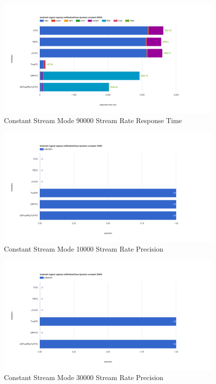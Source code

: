 \begin{figure}[!htbp]
    \centering
    \includegraphics[width=\textwidth]{img/app3-c-90000-r.png}
    \caption{Constant Stream Mode 90000 Stream Rate Response Time}
\end{figure}
\begin{figure}[!htbp]
    \centering
    \includegraphics[width=\textwidth]{img/app3-c-10000-p.png}
    \caption{Constant Stream Mode 10000 Stream Rate Precision}
\end{figure}
\begin{figure}[!htbp]
    \centering
    \includegraphics[width=\textwidth]{img/app3-c-30000-p.png}
    \caption{Constant Stream Mode 30000 Stream Rate Precision}
\end{figure}
